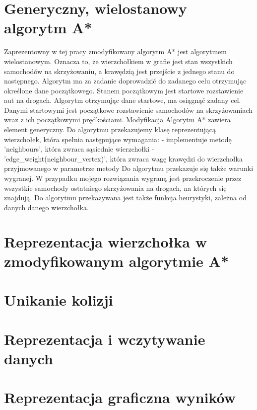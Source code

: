 \section{Generyczny, wielostanowy algorytm A*}

Zaprezentowny w tej pracy zmodyfikowany algorytm A* jest algorytmem wielostanowym. Oznacza to, że wierzchołkiem w grafie jest stan wszystkich samochodów na skrzyżowaniu, a krawędzią jest przejście z jednego stanu do następnego.
\newline
Algorytm ma za zadanie doprowadzić do zadanego celu otrzymując określone dane początkowego. Stanem początkowym jest startowe rozstawienie aut na drogach.
\newline
Algorytm otrzymując dane startowe, ma osiągnąć zadany cel. Danymi startowymi jest początkowe rozstawienie samochodów na skrzyżowaniach wraz z ich początkowymi prędkościami.
\newline
Modyfikacja Algorytm A* zawiera element generyczny. Do algorytmu przekazujemy klasę reprezentującą wierzchołek, która spełnia następujące wymagania:
\newline
- implementuje metodę 'neighbours', która zwraca sąsiednie wierzchołki 
\newline
- 'edge_weight(neighbour_vertex)', która zwraca wagę krawędzi do wierzchołka przyjmowanego w parametrze metody
\newline
\newline
Do algorytmu przekazuje się także warunki wygranej. W przypadku mojego rozwiązania wygraną jest przekroczenie przez wszystkie samochody ostatniego skrzyżowania na drogach, na których się znajdują.
\newline
Do algorytmu przekazywana jest także funkcja heurystyki, zależna od danych danego wierzchołka.

\section{Reprezentacja wierzchołka w zmodyfikowanym algorytmie A*}

\section{Unikanie kolizji}

\section{Reprezentacja i wczytywanie danych}

\section{Reprezentacja graficzna wyników}
